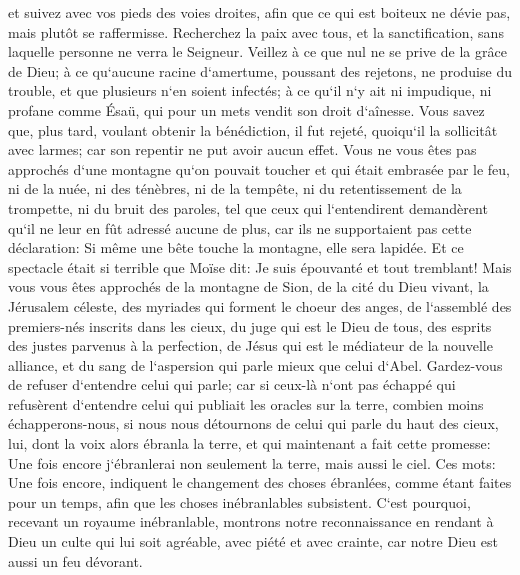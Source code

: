 \verse et suivez avec vos pieds des voies droites, afin que ce qui est boiteux ne dévie pas, mais plutôt se raffermisse. 
\verse Recherchez la paix avec tous, et la sanctification, sans laquelle personne ne verra le Seigneur. 
\verse Veillez à ce que nul ne se prive de la grâce de Dieu; à ce qu`aucune racine d`amertume, poussant des rejetons, ne produise du trouble, et que plusieurs n`en soient infectés; 
\verse à ce qu`il n`y ait ni impudique, ni profane comme Ésaü, qui pour un mets vendit son droit d`aînesse. 
\verse Vous savez que, plus tard, voulant obtenir la bénédiction, il fut rejeté, quoiqu`il la sollicitât avec larmes; car son repentir ne put avoir aucun effet. 
\verse Vous ne vous êtes pas approchés d`une montagne qu`on pouvait toucher et qui était embrasée par le feu, ni de la nuée, ni des ténèbres, ni de la tempête, 
\verse ni du retentissement de la trompette, ni du bruit des paroles, tel que ceux qui l`entendirent demandèrent qu`il ne leur en fût adressé aucune de plus, 
\verse car ils ne supportaient pas cette déclaration: Si même une bête touche la montagne, elle sera lapidée. 
\verse Et ce spectacle était si terrible que Moïse dit: Je suis épouvanté et tout tremblant! 
\verse Mais vous vous êtes approchés de la montagne de Sion, de la cité du Dieu vivant, la Jérusalem céleste, des myriades qui forment le choeur des anges, 
\verse de l`assemblé des premiers-nés inscrits dans les cieux, du juge qui est le Dieu de tous, des esprits des justes parvenus à la perfection, 
\verse de Jésus qui est le médiateur de la nouvelle alliance, et du sang de l`aspersion qui parle mieux que celui d`Abel. 
\verse Gardez-vous de refuser d`entendre celui qui parle; car si ceux-là n`ont pas échappé qui refusèrent d`entendre celui qui publiait les oracles sur la terre, combien moins échapperons-nous, si nous nous détournons de celui qui parle du haut des cieux, 
\verse lui, dont la voix alors ébranla la terre, et qui maintenant a fait cette promesse: Une fois encore j`ébranlerai non seulement la terre, mais aussi le ciel. 
\verse Ces mots: Une fois encore, indiquent le changement des choses ébranlées, comme étant faites pour un temps, afin que les choses inébranlables subsistent. 
\verse C`est pourquoi, recevant un royaume inébranlable, montrons notre reconnaissance en rendant à Dieu un culte qui lui soit agréable, 
\verse avec piété et avec crainte, car notre Dieu est aussi un feu dévorant. 

